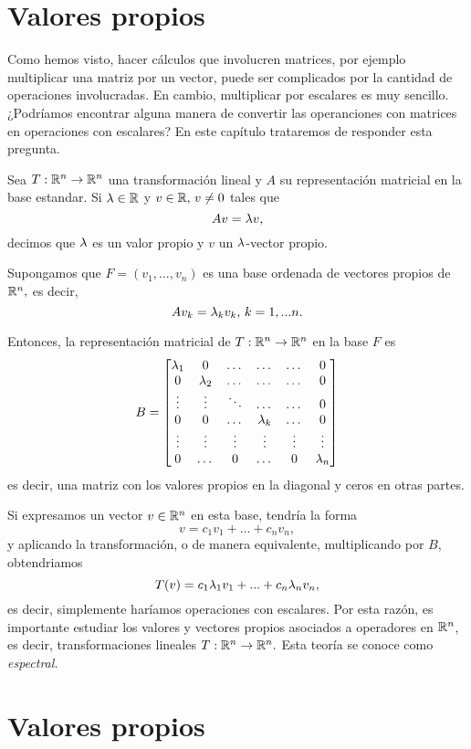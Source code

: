 \section{Valores propios}


Como hemos visto, hacer cálculos que involucren matrices, por ejemplo multiplicar una matriz por un vector, puede ser
complicados por la cantidad de operaciones involucradas. En cambio, multiplicar por escalares es muy sencillo.
¿Podríamos encontrar alguna manera de convertir las operanciones con matrices en operaciones con escalares? En este
capítulo trataremos de responder esta pregunta.

\begin{defn}
 Sea $T:\mathbb{R}^{n}\to \mathbb{R}^{n}$ una transformación lineal y $A$ su representación matricial en la base estandar. Si $\lambda\in
\mathbb{R}$ y $v\in \mathbb{R}, \, v\neq 0$ tales que
$$
Av=\lambda v,
$$
decimos que $\lambda$ es un valor propio y $v$ un $\lambda$-vector propio.
\end{defn}

Supongamos que $F=\left( v_{1},...,v_{n} \right)$ es una base ordenada de vectores propios de $\mathbb{R}^{n},$ es decir,
$$
Av_{k}=\lambda_{k}v_{k}, \, k=1,...n.
$$

Entonces, la representación matricial de $T:\mathbb{R}^{n}\to \mathbb{R}^{n}$ en la base $F$ es
$$
B=\begin{bmatrix}
 \lambda_{1} & 0 & \dots & \dots & \dots & 0 \\
 0 & \lambda_{2} & \dots & \dots & \dots & 0 \\
 \vdots & \vdots & \ddots & \dots & \dots & 0 \\
 0 & 0 & \dots & \lambda_{k} & \dots & 0 \\
 \vdots & \vdots &\vdots &\vdots &\vdots &\vdots \\
 0 & \dots & 0 & \dots & 0 & \lambda_{n}
\end{bmatrix}
$$
es decir, una matriz con los valores propios en la diagonal y ceros en otras partes.

Si expresamos un vector $v\in \mathbb{R}^{n}$ en esta base, tendría la forma
$$
v=c_{1}v_{1}+...+c_{n}v_{n},
$$
y aplicando la transformación, o de manera equivalente, multiplicando por $B$, obtendriamos
$$
T(v)=c_{1}\lambda_{1}v_{1}+...+c_{n}\lambda_{n}v_{n},
$$
es decir, simplemente haríamos operaciones con escalares. Por esta razón, es importante estudiar los valores y vectores
propios asociados a operadores en $\mathbb{R}^{n}$, es decir, transformaciones lineales $T:\mathbb{R}^{n}\to \mathbb{R}^{n}.$ Esta teoría se
conoce como \emph{espectral.}

\section{Valores propios}


